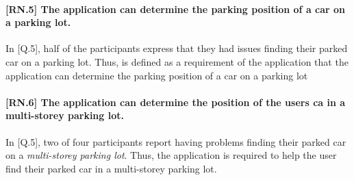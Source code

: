 \paragraph{[RN.5] The application can determine the parking position of a car on a parking lot.}
In [Q.5], half of the participants express that they had issues finding their parked car on a parking lot. Thus, is defined as a requirement of the application that the application can determine the parking position of a car on a parking lot


\paragraph{[RN.6] The application can determine the position of the users ca in a multi-storey parking lot.}
In [Q.5], two of four participants report having problems finding their parked car on a \textit{multi-storey parking lot}. Thus, the application is required to help the user find their parked car in a multi-storey parking lot. 



